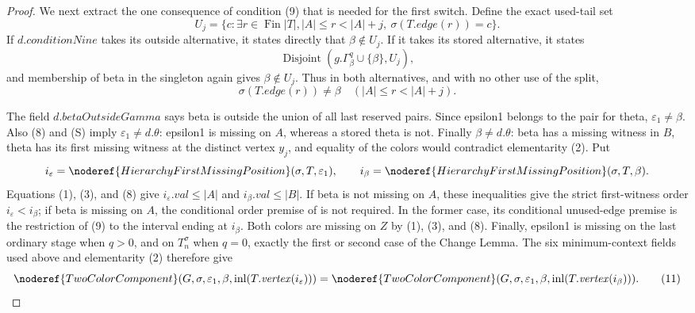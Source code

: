 \begin{proof}
We next extract the one consequence of condition (9) that is needed for
the first switch.  Define the exact used-tail set
\[
 U_j=\{c:\exists r\in\operatorname{Fin}|T|,
 |A|\le r<|A|+j,\ \sigma(T.\mathit{edge}(r))=c\}.
\]
If $d.\mathit{conditionNine}$ takes its outside alternative, it states
directly that $\beta\notin U_j$.  If it takes its stored alternative,
it states
\[
 \operatorname{Disjoint}(g.\Gamma^q_\beta\cup\{\beta\},U_j),
\]
and membership of beta in the singleton again gives
$\beta\notin U_j$.  Thus in both alternatives, and with no other use of
the split,
\[
 \sigma(T.\mathit{edge}(r))\ne\beta
       \quad(|A|\le r<|A|+j).                                \tag{10}
\]

The field $d.\mathit{betaOutsideGamma}$ says beta is outside the union
of all last reserved pairs.  Since epsilon1 belongs to the pair for
theta, $\varepsilon _1\ne\beta$.  Also (8) and (S) imply
$\varepsilon _1\ne d.\theta$: epsilon1 is missing on $A$, whereas a
stored theta is not.  Finally $\beta\ne d.\theta$: beta has a missing
witness in $B$, theta has its first missing witness at the distinct
vertex $y_j$, and equality of the colors would contradict elementarity
(2).  Put
\[
 i_\varepsilon=
   \noderef{HierarchyFirstMissingPosition}(\sigma,T,\varepsilon _1),
 \qquad
 i_\beta=\noderef{HierarchyFirstMissingPosition}(\sigma,T,\beta).
\]
Equations (1), (3), and (8) give
$i_\varepsilon.\mathit{val}\le |A|$ and
$i_\beta.\mathit{val}\le |B|$.  If beta is not missing on $A$, these
inequalities give the strict first-witness order
$i_\varepsilon<i_\beta$; if beta is missing on $A$, the conditional
order premise of  is not required.  In the former
case, its conditional unused-edge premise is the restriction of (9) to
the interval ending at $i_\beta$.  Both colors are missing on $Z$ by
(1), (3), and (8).  Finally, epsilon1 is missing on the last ordinary
stage when $q>0$, and on $T_n^\sigma$ when $q=0$, exactly the first or
second case of the Change Lemma.  The six minimum-context fields used
above and elementarity (2) therefore give
\[
 \noderef{TwoColorComponent}(G,\sigma,\varepsilon _1,\beta,
   \operatorname{inl}(T.\mathit{vertex}(i_\varepsilon)))
 =
 \noderef{TwoColorComponent}(G,\sigma,\varepsilon _1,\beta,
   \operatorname{inl}(T.\mathit{vertex}(i_\beta))).           \tag{11}
\]


\end{proof}
